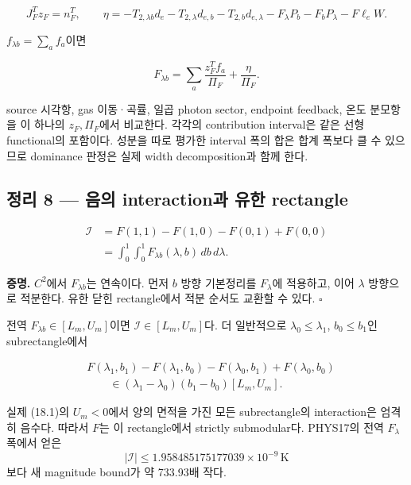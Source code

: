 \[
J_F^Tz_F=n_F^T,\qquad
\eta=-T_{2,\lambda b}d_e-T_{2,\lambda}d_{e,b}
-T_{2,b}d_{e,\lambda}
-F_\lambda P_b-F_bP_\lambda-F\ell_eW.
\]

\(f_{\lambda b}=\sum_a f_a\)이면

\[
\boxed{
F_{\lambda b}
=\sum_a\frac{z_F^Tf_a}{\Pi_F}+\frac{\eta}{\Pi_F}.
}
\tag{18.55}
\]

source 시각항, gas 이동·곡률, 일곱 photon sector, endpoint feedback,
온도 분모항을 이 하나의 \(z_F,\Pi_F\)에서 비교한다. 각각의 contribution
interval은 같은 선형 functional의 포함이다. 성분을 따로 평가한 interval
폭의 합은 합계 폭보다 클 수 있으므로 dominance 판정은 실제 width
decomposition과 함께 한다.

\hypertarget{uxc815uxb9ac-8-uxc74cuxc758-interactionuxacfc-uxc720uxd55c-rectangle}{%
\subsection{정리 8 --- 음의 interaction과 유한
rectangle}\label{uxc815uxb9ac-8-uxc74cuxc758-interactionuxacfc-uxc720uxd55c-rectangle}}

\[
\boxed{\begin{aligned}
\mathcal I
&=F(1,1)-F(1,0)-F(0,1)+F(0,0)\\
&=\int_0^1\!\int_0^1F_{\lambda b}(\lambda,b)\,db\,d\lambda.
\end{aligned}}
\tag{18.56}
\]

\textbf{증명.} \(C^2\)에서 \(F_{\lambda b}\)는 연속이다. 먼저 \(b\) 방향
기본정리를 \(F_\lambda\)에 적용하고, 이어 \(\lambda\) 방향으로 적분한다.
유한 닫힌 rectangle에서 적분 순서도 교환할 수 있다. \(\square\)

전역 \(F_{\lambda b}\in[L_m,U_m]\)이면 \(\mathcal I\in[L_m,U_m]\)다. 더
일반적으로 \(\lambda_0\le\lambda_1\), \(b_0\le b_1\)인 subrectangle에서

\[
\begin{aligned}
&F(\lambda_1,b_1)-F(\lambda_1,b_0)
-F(\lambda_0,b_1)+F(\lambda_0,b_0)\\
&\hspace{2em}\in
(\lambda_1-\lambda_0)(b_1-b_0)[L_m,U_m].
\end{aligned}
\tag{18.57}
\]

실제 (18.1)의 \(U_m<0\)에서 양의 면적을 가진 모든 subrectangle의
interaction은 엄격히 음수다. 따라서 \(F\)는 이 rectangle에서 strictly
submodular다. PHYS17의 전역 \(F_\lambda\) 폭에서 얻은 \[
|\mathcal I|\le1.958485175177039\times10^{-9}\,\mathrm{K}
\tag{18.58}
\] 보다 새 magnitude bound가 약 733.93배 작다.


